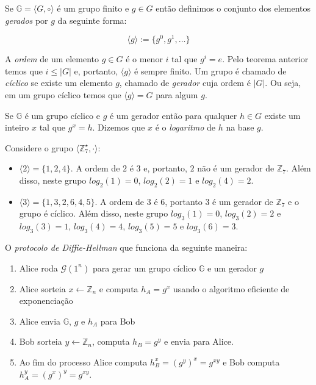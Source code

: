 Se $\mathbb{G} = \langle G, \circ \rangle$ é um grupo finito e $g \in G$ então definimos o conjunto dos elementos {\em gerados} por $g$ da seguinte forma:

\begin{displaymath}
  \langle g \rangle := \{g^0, g^1, \dots \}
\end{displaymath}

A {\em ordem} de um elemento $g \in G$ é o menor $i$ tal que $g^i = e$.
Pelo teorema anterior temos que $i \leq |G|$ e, portanto, $\langle g \rangle$ é sempre finito.
Um grupo é chamado de {\em cíclico} se existe um elemento $g$, chamado de {\em gerador} cuja ordem é $|G|$.
Ou seja, em um grupo cíclico temos que $\langle g \rangle = G$ para algum $g$.

Se $\mathbb{G}$ é um grupo cíclico e $g$ é um gerador então para qualquer $h \in G$ existe um inteiro $x$ tal que $g^x = h$.
Dizemos que $x$ é o {\em logaritmo} de $h$ na base $g$.


\begin{example}
Considere o grupo $\langle \mathbb{Z}_7^\star, \cdot \rangle$:
\begin{itemize}
\item $\langle 2 \rangle = \{1, 2, 4\}$. A ordem de $2$ é $3$ e, portanto, $2$ não é um gerador de $\mathbb{Z}_7$. 
Além disso, neste grupo $log_2(1) = 0$, $log_2(2) = 1$ e $log_2(4) = 2$. 
\item $\langle 3 \rangle = \{1, 3, 2, 6, 4, 5\}$. A ordem de $3$ é $6$, portanto $3$ é um gerador de $\mathbb{Z}_7$ e o grupo é cíclico.
Além disso, neste grupo $log_3(1) = 0$, $log_3(2) = 2$ e $log_3(3) = 1$, $log_3(4)= 4$, $log_3(5) = 5$ e $log_3(6) = 3$. 
\end{itemize}
\end{example}


O {\em protocolo de Diffie-Hellman} que funciona da seguinte maneira:
\begin{enumerate}
\item Alice roda $\mathcal{G}(1^n)$ para gerar um grupo cíclico $\mathbb{G}$ e um gerador $g$
\item Alice sorteia $x \leftarrow \mathbb{Z}_n$ e computa $h_A = g^x$ usando o algoritmo eficiente de exponenciação
\item Alice envia $\mathbb{G}$, $g$ e $h_A$ para Bob
\item Bob sorteia $y \leftarrow \mathbb{Z}_n$, computa $h_B = g^y$ e envia para Alice.
\item Ao fim do processo Alice computa $h_B^x = (g^y)^x = g^{xy}$ e Bob computa $h_A^y = (g^x)^y = g^{xy}$.
\end{enumerate}

